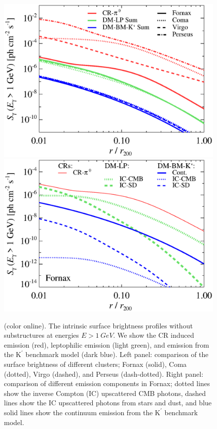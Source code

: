 \documentclass[10pt,aps,pra,reprint,amsmath,amsfonts,amssymb,showpacs,nofootinbib,floatfix]{revtex4-1}
\newcommand{\rmn}{\mathrm}
\newcommand{\Kp}{\rmn{K}^\prime}
\newcommand{\colo}{(color online). }
\begin{document}
\begin{figure}
\begin{minipage}{2.0\columnwidth}
  \includegraphics[width=0.49\columnwidth]{figures/SB.v14.1GeV.SF700.noSuB.elmu.bw.eps}
  \includegraphics[width=0.49\columnwidth]{figures/SB.fornax.v14.1GeV.SF700.noSuB.elmu.bw.eps}
  \caption{\colo The intrinsic surface brightness profiles without
    substructures at energies $E>1\ GeV$. We show the CR induced
    emission (red), leptophilic emission (light green), and emission
    from the $\Kp$ benchmark model (dark blue). Left panel: comparison
    of the surface brightness of different clusters; Fornax (solid),
    Coma (dotted), Virgo (dashed), and Perseus (dash-dotted). Right
    panel: comparison of different emission components in Fornax;
    dotted lines show the inverse Compton (IC) upscattered CMB
    photons, dashed lines show the IC upscattered photons from stars
    and dust, and blue solid lines show the continuum emission from
    the $\Kp$ benchmark model.}
 \label{fig:SB_clu_nosub}
\end{minipage}
\end{figure}
\end{document}
